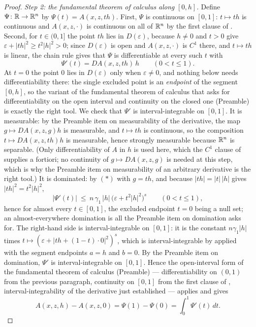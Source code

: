 \begin{proof}
\emph{Step 2: the fundamental theorem of calculus along $[0,h]$.}  Define
$\Psi\colon\mathbb{R}\to\mathbb{R}^n$ by $\Psi(t)=A(x,z,th)$.  First, $\Psi$ is continuous on
$[0,1]$: $t\mapsto th$ is continuous and $A(x,z,\cdot)$ is continuous on all of
$\mathbb{R}^n$ by the first clause of .  Second, for
$t\in(0,1]$ the point $th$ lies in $D(\varepsilon)$, because $h\ne0$ and $t>0$
give $\varepsilon+|th|^2\ge t^2|h|^2>0$; since $D(\varepsilon)$ is open and
$A(x,z,\cdot)$ is $C^1$ there, and $t\mapsto th$ is linear, the chain rule gives
that $\Psi$ is differentiable at every such $t$ with
\[
\Psi'(t)=DA(x,z,th)\,h\qquad(0<t\le1).
\]
At $t=0$ the point $0$ lies in $D(\varepsilon)$ only when $\varepsilon\ne0$, and
nothing below needs differentiability there: the single excluded point is an
\emph{endpoint} of the segment $[0,h]$, so the variant of the fundamental
theorem of calculus that asks for differentiability on the open interval and
continuity on the closed one (Preamble) is exactly the right tool.
We check that $\Psi'$ is interval-integrable on $[0,1]$.  It is measurable:
by the Preamble item on measurability of the derivative, the map
$g\mapsto DA(x,z,g)h$ is measurable, and $t\mapsto th$ is continuous, so the
composition $t\mapsto DA(x,z,th)h$ is measurable, hence strongly measurable
because $\mathbb{R}^n$ is separable.  (Only differentiability of $A$ in $h$ is used
here, which the $C^1$ clause of  supplies a
fortiori; no continuity of $g\mapsto DA(x,z,g)$ is needed at this step, which
is why the Preamble item on measurability of an arbitrary derivative is the
right tool.)  It is
dominated: by $(*)$ with $g=th$, and because $|th|=|t|\,|h|$ gives
$|th|^2=t^2|h|^2$,
\[
|\Psi'(t)|\ \le\ n\,\gamma_1\,|h|\,\bigl(\varepsilon+t^2|h|^2\bigr)^{s}
\qquad(0<t\le1),
\]
hence for almost every $t\in[0,1]$, the excluded endpoint $t=0$ being a null
set; an almost-everywhere domination is all the Preamble item on domination
asks for.
The right-hand side is interval-integrable on $[0,1]$: it is the constant
$n\gamma_1|h|$ times $t\mapsto(\varepsilon+|th+(1-t)\cdot0|^2)^{s}$, which is
interval-integrable by  applied with the
segment endpoints $a=h$ and $b=0$.  By the Preamble item on domination,
$\Psi'$ is interval-integrable on $[0,1]$.  Hence the open-interval form of the
fundamental theorem of calculus (Preamble) --- differentiability on $(0,1)$ from
the previous paragraph, continuity on $[0,1]$ from the first clause of
, interval-integrability of the derivative just
established --- applies and gives
\[
A(x,z,h)-A(x,z,0)=\Psi(1)-\Psi(0)=\int_0^1\Psi'(t)\,dt .
\]


\end{proof}

